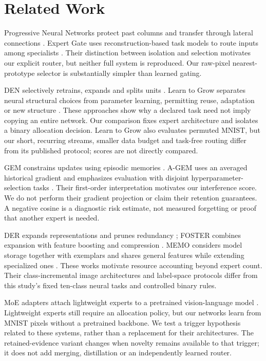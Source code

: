 \section{Related Work}
Progressive Neural Networks protect past columns and transfer through lateral connections \cite{pnn}. Expert Gate uses reconstruction-based task models to route inputs among specialists \cite{expertgate}. Their distinction between isolation and selection motivates our explicit router, but neither full system is reproduced. Our raw-pixel nearest-prototype selector is substantially simpler than learned gating.

DEN selectively retrains, expands and splits units \cite{den}. Learn to Grow separates neural structural choices from parameter learning, permitting reuse, adaptation or new structure \cite{l2g}. These approaches show why a declared task need not imply copying an entire network. Our comparison fixes expert architecture and isolates a binary allocation decision. Learn to Grow also evaluates permuted MNIST, but our short, recurring streams, smaller data budget and task-free routing differ from its published protocol; scores are not directly compared.

GEM constrains updates using episodic memories \cite{gem}. A-GEM uses an averaged historical gradient and emphasizes evaluation with disjoint hyperparameter-selection tasks \cite{agem}. Their first-order interpretation motivates our interference score. We do not perform their gradient projection or claim their retention guarantees. A negative cosine is a diagnostic risk estimate, not measured forgetting or proof that another expert is needed.

DER expands representations and prunes redundancy \cite{der}; FOSTER combines expansion with feature boosting and compression \cite{foster}. MEMO considers model storage together with exemplars and shares general features while extending specialized ones \cite{memo}. These works motivate resource accounting beyond expert count. Their class-incremental image architectures and label-space protocols differ from this study's fixed ten-class neural tasks and controlled binary rules.

MoE adapters attach lightweight experts to a pretrained vision-language model \cite{moeadapters}. Lightweight experts still require an allocation policy, but our networks learn from MNIST pixels without a pretrained backbone. We test a trigger hypothesis related to these systems, rather than a replacement for their architectures. The retained-evidence variant changes when novelty remains available to that trigger; it does not add merging, distillation or an independently learned router.
